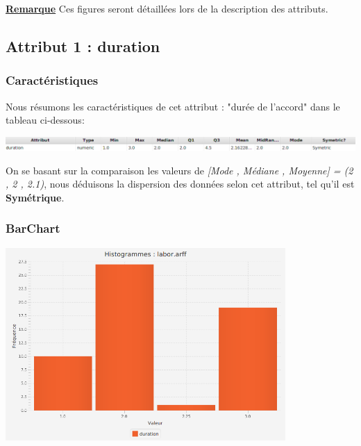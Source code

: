 \documentclass[12pt,a4paper,oneside]{book}
\begin{document}
\underline{\textbf{Remarque}}
Ces figures seront détaillées lors de la description des attributs.

\newpage

\subsection{Attribut 1 : duration }
\subsubsection{Caractéristiques}
Nous résumons les caractéristiques de cet attribut : "durée de l'accord" dans le tableau ci-dessous:
\begin{center}
	\includegraphics[width=1\textwidth]{screens/att-1.png}%
	\label{labelname}%
\end{center}
On se basant sur la comparaison les valeurs de \textit{[Mode , Médiane , Moyenne] = (2 , 2 , 2.1)}, nous déduisons la dispersion des données selon cet attribut, tel qu'il est \textbf{Symétrique}.

\subsubsection{BarChart}

\begin{center}
	\includegraphics[width=0.8\textwidth]{screens/barchart/duration-barchart.png}%
	\label{labelname}%
\end{center}
\end{document}
